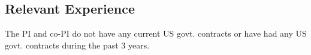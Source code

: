 \subsection{Relevant Experience}


The PI and co-PI do not have any current US govt. contracts or have
had any US govt. contracts during the past 3 years.


